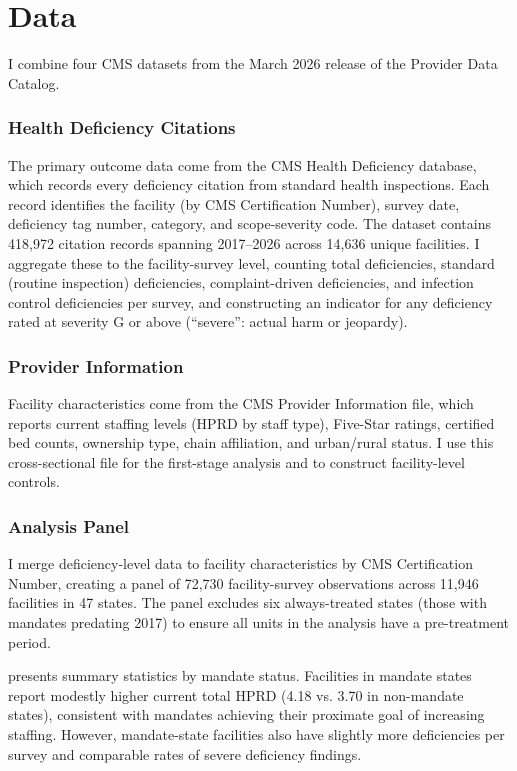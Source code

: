\documentclass[12pt]{article}
\begin{document}
\section{Data}

I combine four CMS datasets from the March 2026 release of the Provider Data Catalog.

\subsubsection*{Health Deficiency Citations} The primary outcome data come from the CMS Health Deficiency database, which records every deficiency citation from standard health inspections. Each record identifies the facility (by CMS Certification Number), survey date, deficiency tag number, category, and scope-severity code. The dataset contains 418,972 citation records spanning 2017--2026 across 14,636 unique facilities. I aggregate these to the facility-survey level, counting total deficiencies, standard (routine inspection) deficiencies, complaint-driven deficiencies, and infection control deficiencies per survey, and constructing an indicator for any deficiency rated at severity G or above (``severe'': actual harm or jeopardy).

\subsubsection*{Provider Information} Facility characteristics come from the CMS Provider Information file, which reports current staffing levels (HPRD by staff type), Five-Star ratings, certified bed counts, ownership type, chain affiliation, and urban/rural status. I use this cross-sectional file for the first-stage analysis and to construct facility-level controls.

\subsubsection*{Analysis Panel} I merge deficiency-level data to facility characteristics by CMS Certification Number, creating a panel of 72,730 facility-survey observations across 11,946 facilities in 47 states. The panel excludes six always-treated states (those with mandates predating 2017) to ensure all units in the analysis have a pre-treatment period.



 presents summary statistics by mandate status. Facilities in mandate states report modestly higher current total HPRD (4.18 vs. 3.70 in non-mandate states), consistent with mandates achieving their proximate goal of increasing staffing. However, mandate-state facilities also have slightly more deficiencies per survey and comparable rates of severe deficiency findings.
\end{document}
